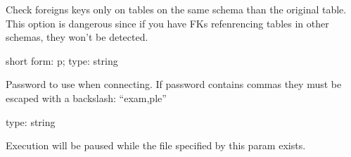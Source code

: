 \documentclass[letterpaper,10pt,english]{sphinxmanual}
\begin{document}
\begin{fulllineitems}
\label{\detokenize{mariadb-schema-change:cmdoption-mariadb-schema-change-only-same-schema-fks}}
Check foreigns keys only on tables on the same schema than the original table.
This option is dangerous since if you have FKs refenrencing tables in other
schemas, they won’t be detected.

\end{fulllineitems}


\begin{fulllineitems}
\label{\detokenize{mariadb-schema-change:cmdoption-mariadb-schema-change-password}}
short form: \sphinxhyphen{}p; type: string

Password to use when connecting.
If password contains commas they must be escaped with a backslash: “exam,ple”

\end{fulllineitems}


\begin{fulllineitems}
\label{\detokenize{mariadb-schema-change:cmdoption-mariadb-schema-change-pause-file}}
type: string

Execution will be paused while the file specified by this param exists.

\end{fulllineitems}
\end{document}
